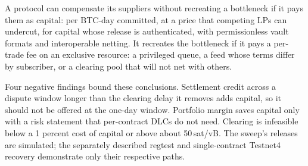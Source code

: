 A protocol can compensate its suppliers without recreating a bottleneck if it pays them as capital: per BTC-day committed, at a price that competing LPs can undercut, for capital whose release is authenticated, with permissionless vault formats and interoperable netting. It recreates the bottleneck if it pays a per-trade fee on an exclusive resource: a privileged queue, a feed whose terms differ by subscriber, or a clearing pool that will not net with others.

Four negative findings bound these conclusions. Settlement credit across a dispute window longer than the clearing delay it removes adds capital, so it should not be offered at the one-day window. Portfolio margin saves capital only with a risk statement that per-contract DLCs do not need. Clearing is infeasible below a 1 percent cost of capital or above about 50\,sat/vB. The sweep's releases are simulated; the separately described regtest and single-contract Testnet4 recovery demonstrate only their respective paths.
